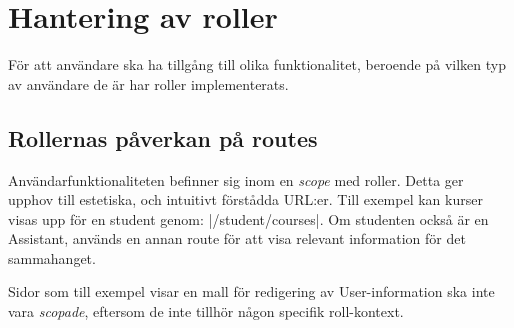\section{Hantering av roller}

För att användare ska ha tillgång till olika funktionalitet, beroende på vilken typ av användare de är har roller implementerats. 

\subsection{Rollernas påverkan på routes}
Användarfunktionaliteten befinner sig inom en \emph{scope} med roller. Detta ger upphov till estetiska, och intuitivt förstådda URL:er. Till exempel kan kurser visas upp för en student genom: |/student/courses|. Om studenten också är en Assistant, används en annan route för att visa relevant information för det sammahanget.

Sidor som till exempel visar en mall för redigering av User-information ska inte vara \emph{scopade}, eftersom de inte tillhör någon specifik roll-kontext.
